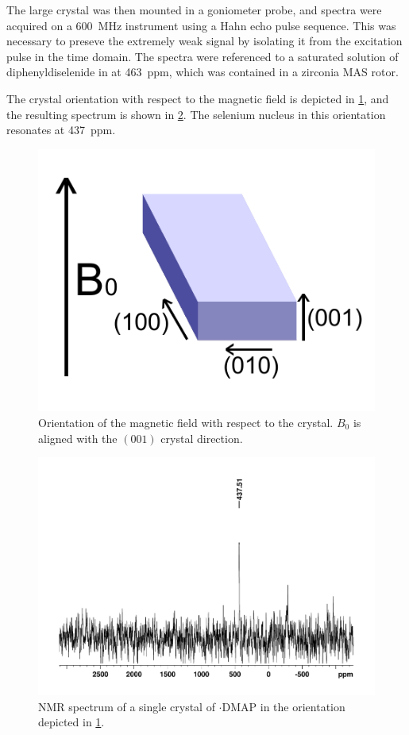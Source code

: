 \begin{refsection}
The large crystal was then mounted in a goniometer probe, and spectra were acquired on a 600~MHz instrument using a Hahn echo pulse sequence.
This was necessary to preseve the extremely weak signal by isolating it from the excitation pulse in the time domain.
The spectra were referenced to a saturated solution of diphenyldiselenide in  at 463~ppm, which was contained in a zirconia MAS rotor.\autocite{Duddeck1995}

The crystal orientation with respect to the magnetic field is depicted in \cref{fig:ebs-ph-dmap-magfield-index}, and the resulting spectrum is shown in \cref{fig:ebs-dmap-hahnecho-77se}.
The selenium nucleus in this orientation resonates at 437~ppm.

\begin{figure}
  \centering
  \includegraphics[width=0.3\linewidth]{Figures/ebs-ph-dmap-magfield-index.pdf}
  \caption{Orientation of the magnetic field with respect to the crystal. $B_{0}$ is aligned with the $(0 0 1)$ crystal direction.}
  \label{fig:ebs-ph-dmap-magfield-index}
\end{figure}

\begin{figure}
  \centering
  \includegraphics[width=0.8\linewidth]{Figures/ebs-dmap-hahnecho-77se.pdf}
  \caption{ NMR spectrum of a single crystal of $\cdot$DMAP in the orientation depicted in \cref{fig:ebs-ph-dmap-magfield-index}.}
  \label{fig:ebs-dmap-hahnecho-77se}
\end{figure}


\end{refsection}
